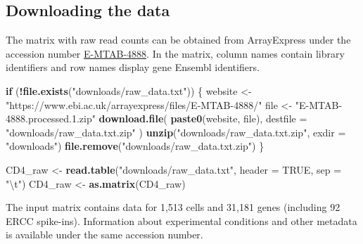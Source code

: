 \documentclass[9pt,a4paper,]{extarticle}
\newenvironment{Shaded}{\begin{snugshade}}{\end{snugshade}}
\newcommand{\CharTok}[1]{\textcolor[rgb]{0.31,0.60,0.02}{#1}}
\newcommand{\ControlFlowTok}[1]{\textcolor[rgb]{0.13,0.29,0.53}{\textbf{#1}}}
\newcommand{\DataTypeTok}[1]{\textcolor[rgb]{0.13,0.29,0.53}{#1}}
\newcommand{\KeywordTok}[1]{\textcolor[rgb]{0.13,0.29,0.53}{\textbf{#1}}}
\newcommand{\NormalTok}[1]{#1}
\newcommand{\OperatorTok}[1]{\textcolor[rgb]{0.81,0.36,0.00}{\textbf{#1}}}
\newcommand{\OtherTok}[1]{\textcolor[rgb]{0.56,0.35,0.01}{#1}}
\newcommand{\StringTok}[1]{\textcolor[rgb]{0.31,0.60,0.02}{#1}}
\begin{document}
\hypertarget{downloading-the-data}{%
\subsection{Downloading the data}\label{downloading-the-data}}

The matrix with raw read counts can be obtained from ArrayExpress under the
accession number
\href{https://www.ebi.ac.uk/arrayexpress/experiments/E-MTAB-4888/}{E-MTAB-4888}.
In the matrix, column names contain library identifiers and row names
display gene Ensembl identifiers.

\begin{Shaded}
\begin{Highlighting}[]
\ControlFlowTok{if}\NormalTok{ (}\OperatorTok{!}\KeywordTok{file.exists}\NormalTok{(}\StringTok{"downloads/raw_data.txt"}\NormalTok{)) \{}
\NormalTok{  website <-}\StringTok{ "https://www.ebi.ac.uk/arrayexpress/files/E-MTAB-4888/"}
\NormalTok{  file <-}\StringTok{ "E-MTAB-4888.processed.1.zip"}
  \KeywordTok{download.file}\NormalTok{(}
    \KeywordTok{paste0}\NormalTok{(website, file),}
    \DataTypeTok{destfile =} \StringTok{"downloads/raw_data.txt.zip"}
\NormalTok{  )}
  \KeywordTok{unzip}\NormalTok{(}\StringTok{"downloads/raw_data.txt.zip"}\NormalTok{, }\DataTypeTok{exdir =} \StringTok{"downloads"}\NormalTok{)}
  \KeywordTok{file.remove}\NormalTok{(}\StringTok{"downloads/raw_data.txt.zip"}\NormalTok{)}
\NormalTok{\}}

\NormalTok{CD4_raw <-}\StringTok{ }\KeywordTok{read.table}\NormalTok{(}\StringTok{"downloads/raw_data.txt"}\NormalTok{, }\DataTypeTok{header =} \OtherTok{TRUE}\NormalTok{, }\DataTypeTok{sep =} \StringTok{"}\CharTok{\textbackslash{}t}\StringTok{"}\NormalTok{)}
\NormalTok{CD4_raw <-}\StringTok{ }\KeywordTok{as.matrix}\NormalTok{(CD4_raw)}
\end{Highlighting}
\end{Shaded}

The input matrix contains data for 1,513
cells and 31,181
genes (including 92 ERCC spike-ins).
Information about experimental conditions and other metadata is available
under the same accession number.
\end{document}
